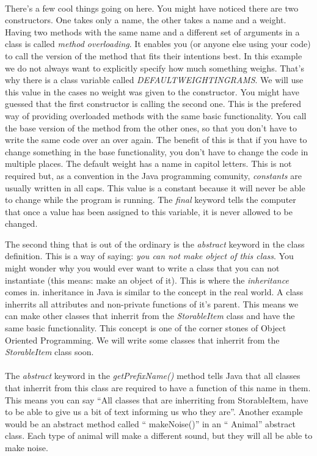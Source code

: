 \documentclass[11pt,fleqn]{book} %
\begin{document}
\paragraph{} There's a few cool things going on here. You might have noticed there are two constructors. One takes only a name, the other takes a name and a weight. Having two methods with the same name and a different set of arguments in a class is called \emph{method overloading}. It enables you (or anyone else using your code) to call the version of the method that fits their intentions best. In this example we do not always want to explicitly specify how much something weighs. That's why there is a class variable called \emph{DEFAULT\textunderscore WEIGHT\textunderscore IN\textunderscore GRAMS}. We will use this value in the cases no weight was given to the constructor. You might have guessed that the first constructor is calling the second one. This is the prefered way of providing overloaded methods with the same basic functionality. You call the base version of the method from the other ones, so that you don't have to write the same code over an over again. The benefit of this is that if you have to change something in the base functionality, you don't have to change the code in multiple places.
The default weight has a name in capitol letters. This is not required but, as a convention in the Java programming comunity, \emph{constants} are usually written in all caps.
This value is a constant because it will never be able to change while the program is running. The \emph{final} keyword tells the computer that once a value has been assigned to this variable, it is never allowed to be changed.

\pargraph{}The second thing that is out of the ordinary is the \emph{abstract} keyword in the class definition. This is a way of saying: \emph{you can not make object of this class}.
You might wonder why you would ever want to write a class that you can not instantiate (this means: make an object of it). This is where the \emph{inheritance} comes in.
inheritance in Java is similar to the concept in the real world. A class inherrits all attributes and non-private functions  of it's parent. This means we can make other classes that inherrit from the \emph{StorableItem} class and have the same basic functionality. This concept is one of the corner stones of Object Oriented Programming.
We will write some classes that inherrit from the \emph{StorableItem} class soon.

\paragraph{}The \emph{abstract} keyword in the \emph{getPrefixName()} method tells Java that all classes that inherrit from this class are required to have a function of this name in them.
This means you can say ``All classes that are inherriting from StorableItem, have to be able to give us a bit of text informing us who they are''. Another example would be an abstract method called `` makeNoise()''  in an `` Animal'' abstract class. Each type of animal will make a different sound, but they will all be able to make noise.
\end{document}
